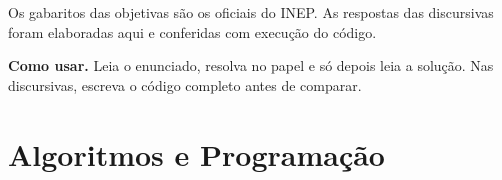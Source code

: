 \documentclass[11pt,a4paper]{article}
\begin{document}
\noindent Os gabaritos das objetivas são os oficiais do INEP. As respostas das
discursivas foram elaboradas aqui e conferidas com execução do código.

\noindent\textbf{Como usar.} Leia o enunciado, resolva no papel e só depois leia a solução.
Nas discursivas, escreva o código completo antes de comparar.

\tableofcontents
\newpage

\section{Algoritmos e Programação}

\end{document}

